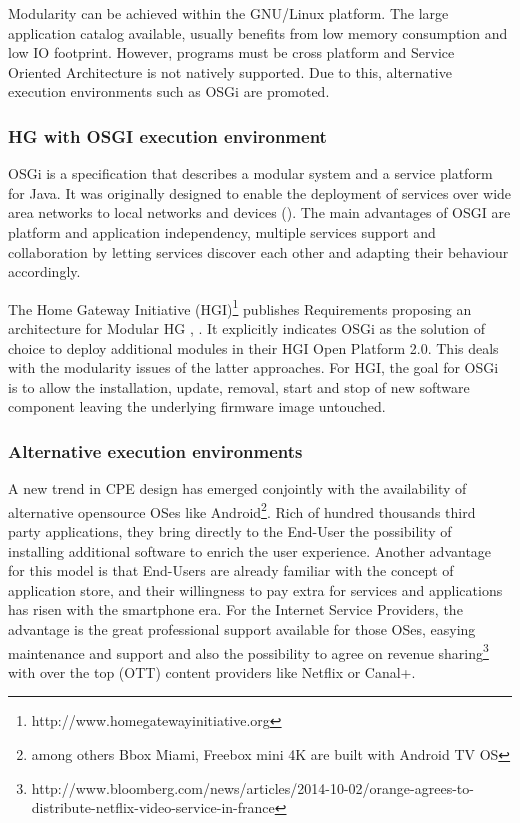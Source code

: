 Modularity can be achieved within the GNU/Linux platform.
The large application catalog available, usually benefits from low memory consumption and low IO footprint.
However, programs must be cross platform and Service Oriented Architecture is not natively supported.
Due to this, alternative execution environments such as OSGi are promoted.


   
\subsubsection{HG with OSGI execution environment}
   
OSGi is a specification that describes a modular system and a service platform for Java.
It was originally designed to enable the deployment of services over wide area networks to local networks and devices (\cite{marples_open_2001}).
The main advantages of OSGI are platform and application independency, multiple services support and collaboration by letting services discover each other and adapting their behaviour accordingly.

The Home Gateway Initiative (HGI)\footnote{http://www.homegatewayinitiative.org} publishes Requirements  proposing an architecture for Modular HG \cite{_requirements_2011}, \cite{_hg_2014}.
It explicitly indicates OSGi as the solution of choice to deploy additional modules in their HGI Open Platform 2.0.
This deals with the modularity issues of the latter approaches.
For HGI, the goal for OSGi is to allow the installation, update, removal, start and stop of new software component leaving the underlying firmware image untouched.

\subsubsection{Alternative execution environments}

A new trend in CPE design has emerged conjointly with the availability of alternative opensource OSes like Android\footnote{among others Bbox Miami, Freebox mini 4K are built with Android TV OS}.
Rich of hundred thousands third party applications, they bring directly to the End-User the possibility of installing additional software to enrich the user experience.
Another advantage for this model is that End-Users are already familiar with the concept of application store, and their willingness to pay extra for services and applications has risen with the smartphone era.
For the Internet Service Providers, the advantage is the great professional support available for those OSes, easying maintenance and support and also the possibility to agree on revenue sharing\footnote{http://www.bloomberg.com/news/articles/2014-10-02/orange-agrees-to-distribute-netflix-video-service-in-france} with over the top (OTT) content providers like Netflix or Canal+.

